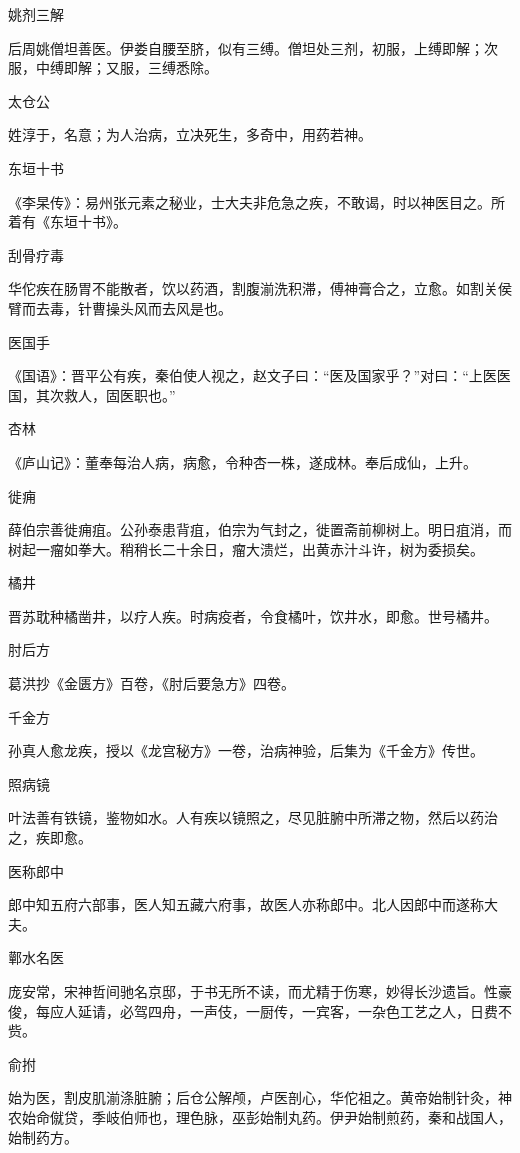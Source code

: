 \documentclass[a4paper,12pt,UTF8,twoside]{ctexbook}
\begin{document}
    姚剂三解
    
    后周姚僧坦善医。伊娄自腰至脐，似有三缚。僧坦处三剂，初服，上缚即解；次服，中缚即解；又服，三缚悉除。
    
    太仓公
    
    姓淳于，名意；为人治病，立决死生，多奇中，用药若神。
    
    东垣十书
    
    《李杲传》：易州张元素之秘业，士大夫非危急之疾，不敢谒，时以神医目之。所着有《东垣十书》。
    
    刮骨疗毒
    
    华佗疾在肠胃不能散者，饮以药酒，割腹湔洗积滞，傅神膏合之，立愈。如割关侯臂而去毒，针曹操头风而去风是也。
    
    医国手
    
    《国语》：晋平公有疾，秦伯使人视之，赵文子曰：“医及国家乎？”对曰：“上医医国，其次救人，固医职也。”
    
    杏林
    
    《庐山记》：董奉每治人病，病愈，令种杏一株，遂成林。奉后成仙，上升。
    
    徙痈
    
    薛伯宗善徙痈疽。公孙泰患背疽，伯宗为气封之，徙置斋前柳树上。明日疽消，而树起一瘤如拳大。稍稍长二十余日，瘤大溃烂，出黄赤汁斗许，树为委损矣。
    
    橘井
    
    晋苏耽种橘凿井，以疗人疾。时病疫者，令食橘叶，饮井水，即愈。世号橘井。
    
    肘后方
    
    葛洪抄《金匮方》百卷，《肘后要急方》四卷。
    
    千金方
    
    孙真人愈龙疾，授以《龙宫秘方》一卷，治病神验，后集为《千金方》传世。
    
    照病镜
    
    叶法善有铁镜，鉴物如水。人有疾以镜照之，尽见脏腑中所滞之物，然后以药治之，疾即愈。
    
    医称郎中
    
    郎中知五府六部事，医人知五藏六府事，故医人亦称郎中。北人因郎中而遂称大夫。
    
    鄿水名医
    
    庞安常，宋神哲间驰名京邸，于书无所不读，而尤精于伤寒，妙得长沙遗旨。性豪俊，每应人延请，必驾四舟，一声伎，一厨传，一宾客，一杂色工艺之人，日费不赀。
    
    俞拊
    
    始为医，割皮肌湔涤脏腑；后仓公解颅，卢医剖心，华佗祖之。黄帝始制针灸，神农始命僦贷，季岐伯师也，理色脉，巫彭始制丸药。伊尹始制煎药，秦和战国人，始制药方。
    
\end{document}
